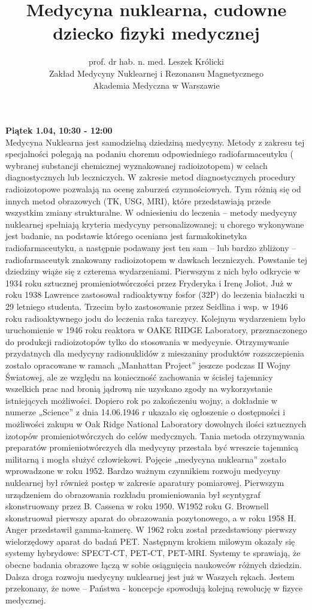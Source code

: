 \documentclass[12pt, a4paper]{article}
\begin{document}
\title{Medycyna nuklearna, cudowne dziecko fizyki medycznej}
\author{prof. dr hab. n. med. Leszek Królicki \\Zakład Medycyny Nuklearnej i Rezonansu Magnetycznego \\Akademia Medyczna w Warszawie}
\date {}
\maketitle
\thispagestyle{title}
\textbf{Piątek 1.04, 10:30 - 12:00}
\\

Medycyna Nuklearna jest samodzielną dziedziną medycyny. Metody z zakresu tej specjalności polegają na podaniu choremu odpowiedniego radiofarmaceutyku ( wybranej substancji chemicznej wyznakowanej radioizotopem) w celach diagnostycznych lub leczniczych. W zakresie metod diagnostycznych procedury radioizotopowe pozwalają na ocenę zaburzeń czynnościowych. Tym różnią się od innych metod obrazowych (TK, USG, MRI), które przedstawiają przede wszystkim zmiany strukturalne. W odniesieniu do leczenia – metody medycyny nuklearnej spełniają kryteria medycyny personalizowanej; u chorego wykonywane jest badanie, na podstawie którego oceniana jest farmakokinetyka radiofarmaceutyku, a następnie podawany jest ten sam – lub bardzo zbliżony – radiofarmaceutyk znakowany radioizotopem w dawkach leczniczych. Powstanie tej dziedziny wiąże się z czterema wydarzeniami. Pierwszym z nich było odkrycie w 1934 roku sztucznej promieniotwórczości przez Fryderyka i Irenę Joliot. Już w roku 1938 Lawrence zastosował radioaktywny fosfor (32P) do leczenia białaczki u 29 letniego studenta. Trzecim było zastosowanie przez Seidlina i wsp. w 1946 roku radioaktywnego jodu do leczenia raka tarczycy. Kolejnym wydarzeniem było uruchomienie w 1946 roku reaktora w OAKE RIDGE Laboratory, przeznaczonego do produkcji radioizotopów tylko do stosowania w medycynie. Otrzymywanie przydatnych dla medycyny radionuklidów z mieszaniny produktów rozszczepienia zostało opracowane w ramach „Manhattan Project” jeszcze podczas II Wojny Światowej, ale ze względu na konieczność zachowania w ścisłej tajemnicy wszelkich prac nad bronią jądrową nie uzyskano zgody na wykorzystanie istniejących możliwości. Dopiero rok po zakończeniu wojny, a dokładnie w numerze „Science” z dnia 14.06.1946 r ukazało się ogłoszenie o dostępności i możliwości zakupu w Oak Ridge National Laboratory dowolnych ilości sztucznych izotopów promieniotwórczych do celów medycznych. Tania metoda otrzymywania preparatów promieniotwórczych dla medycyny przestała być wreszcie tajemnicą militarną i mogła służyć człowiekowi. Pojęcie „medycyna nuklearna” zostało wprowadzone w roku 1952. Bardzo ważnym czynnikiem rozwoju medycyny nuklearnej był również postęp w zakresie aparatury pomiarowej. Pierwszym urządzeniem do obrazowania rozkładu promieniowania był scyntygraf skonstruowany przez B. Cassena w roku 1950. W1952 roku G. Brownell skonstruował pierwszy aparat do obrazowania pozytonowego, a w roku 1958 H. Anger przedstawił gamma-kamerę. W 1962 roku został przedstawiony pierwszy wielorzędowy aparat do badań PET. Następnym krokiem milowym okazały się systemy hybrydowe: SPECT-CT, PET-CT, PET-MRI. Systemy te sprawiają, że obecne badania obrazowe łączą w sobie osiągnięcia naukowców różnych dziedzin. Dalsza droga rozwoju medycyny nuklearnej jest już w Waszych rękach. Jestem przekonany, że nowe – Państwa - koncepcje spowodują kolejną rewolucję w fizyce medycznej.
\end{document}
